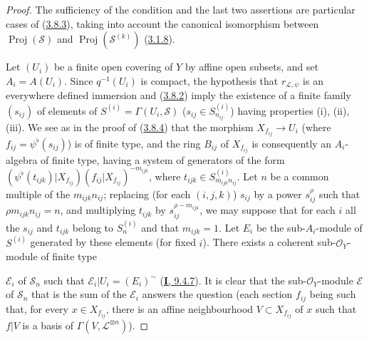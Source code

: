 \begin{proof}
The sufficiency of the condition and the last two assertions are
particular cases of (\hyperref[II.3.8.3]{3.8.3}), taking into account the
canonical isomorphism between $\operatorname{Proj}(\mathcal{S})$ and
$\operatorname{Proj}(\mathcal{S}^{(k)})$
(\hyperref[II.3.1.8]{3.1.8}).

Let $(U_i)$ be a finite open covering of $Y$ by affine open subsets, and
set $A_i=A(U_i)$. Since $q^{-1}(U_i)$ is compact, the hypothesis that
$r_{\mathcal{L},\psi}$ is an everywhere defined immersion and
(\hyperref[II.3.8.2]{3.8.2}) imply the existence of a finite family
$(s_{ij})$ of elements of
$S^{(i)}=\Gamma(U_i,\mathcal{S})$ ($s_{ij}\in S_{n_{ij}}^{(i)}$) having
properties (i), (ii), (iii). We see as in the proof of
(\hyperref[II.3.8.4]{3.8.4}) that the morphism $X_{f_{ij}}\to U_i$ (where
$f_{ij}=\psi^\flat(s_{ij})$) is of finite type, and the ring $B_{ij}$ of
$X_{f_{ij}}$ is consequently an $A_i$-algebra of finite type, having a system
of generators of the form
$(\psi^\flat(t_{ijk})|X_{f_{ij}})(f_{ij}|X_{f_{ij}})^{-m_{ijk}}$, where
$t_{ijk}\in S_{m_{ijk}n_{ij}}^{(i)}$. Let $n$ be a common multiple of the
$m_{ijk}n_{ij}$; replacing (for each $(i,j,k)$) $s_{ij}$ by a
power $s_{ij}^\rho$ such that $\rho m_{ijk}n_{ij}=n$, and multiplying
$t_{ijk}$ by $s_{ij}^{\rho-m_{ijk}}$, we may suppose that for each $i$
all the $s_{ij}$ and $t_{ijk}$ belong to $S_n^{(i)}$ and that
$m_{ijk}=1$. Let $E_i$ be the sub-$A_i$-module of $S^{(i)}$ generated by these
elements (for fixed $i$). There exists a coherent sub-$\mathcal{O}_Y$-module of
finite type


$\mathcal{E}_i$ of $\mathcal{S}_n$ such that
$\mathcal{E}_i|U_i=(E_i)^{\sim}$
(\hyperref[I.9.4.7]{\textbf{I}, 9.4.7}). It is clear that the
sub-$\mathcal{O}_Y$-module $\mathcal{E}$ of $\mathcal{S}_n$ that is the sum of
the $\mathcal{E}_i$ answers the question (each section $f_{ij}$ being such
that, for every $x\in X_{f_{ij}}$, there is an affine neighbourhood
$V\subset X_{f_{ij}}$ of $x$ such that $f|V$ is a basis of
$\Gamma(V,\mathcal{L}^{\otimes n})$).
\end{proof}

